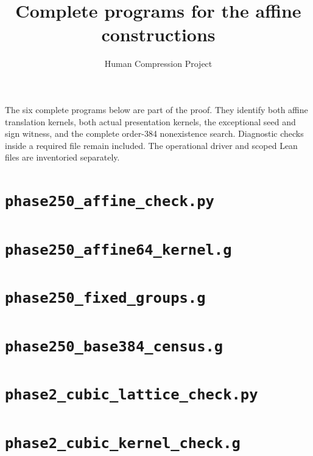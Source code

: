 
\title{Complete programs for the affine constructions}
\author{Human Compression Project}
\date{}

\maketitle
The six complete programs below are part of the proof. They identify both affine translation kernels, both actual presentation kernels, the exceptional seed and sign witness, and the complete order-384 nonexistence search. Diagnostic checks inside a required file remain included. The operational driver and scoped Lean files are inventoried separately.
\section*{\texttt{phase250\_affine\_check.py}}
\section*{\texttt{phase250\_affine64\_kernel.g}}
\section*{\texttt{phase250\_fixed\_groups.g}}
\section*{\texttt{phase250\_base384\_census.g}}
\section*{\texttt{phase2\_cubic\_lattice\_check.py}}
\section*{\texttt{phase2\_cubic\_kernel\_check.g}}

